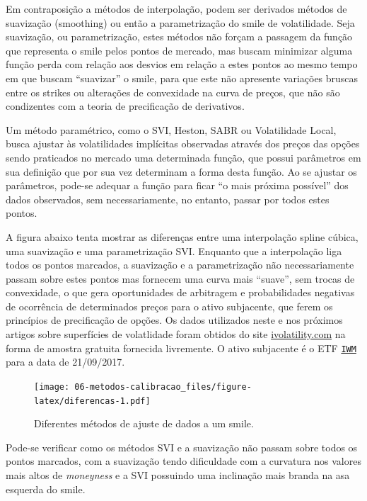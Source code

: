 \documentclass[]{book}
\begin{document}
Em contraposição a métodos de interpolação, podem ser derivados métodos
de suavização (smoothing) ou então a parametrização do smile de
volatilidade. Seja suavização, ou parametrização, estes métodos não
forçam a passagem da função que representa o smile pelos pontos de
mercado, mas buscam minimizar alguma função perda com relação aos
desvios em relação a estes pontos ao mesmo tempo em que buscam
``suavizar'' o smile, para que este não apresente variações bruscas
entre os strikes ou alterações de convexidade na curva de preços, que
não são condizentes com a teoria de precificação de derivativos.

Um método paramétrico, como o SVI, Heston, SABR ou Volatilidade Local,
busca ajustar às volatilidades implícitas observadas através dos preços
das opções sendo praticados no mercado uma determinada função, que
possui parâmetros em sua definição que por sua vez determinam a forma
desta função. Ao se ajustar os parâmetros, pode-se adequar a função para
ficar ``o mais próxima possível'' dos dados observados, sem
necessariamente, no entanto, passar por todos estes pontos.

A figura abaixo tenta mostrar as diferenças entre uma interpolação
spline cúbica, uma suavização e uma parametrização SVI. Enquanto que a
interpolação liga todos os pontos marcados, a suavização e a
parametrização não necessariamente passam sobre estes pontos mas
fornecem uma curva mais ``suave'', sem trocas de convexidade, o que gera
oportunidades de arbitragem e probabilidades negativas de ocorrência de
determinados preços para o ativo subjacente, que ferem os princípios de
precificação de opções. Os dados utilizados neste e nos próximos artigos
sobre superfícies de volatlidade foram obtidos do site
\href{http://www.ivolatility.com/doc/usa/IV_Raw_Delta_surface.csv}{ivolatility.com}
na forma de amostra gratuita fornecida livremente. O ativo subjacente é
o ETF
\href{https://www.ishares.com/us/products/239710/ishares-russell-2000-etf}{\texttt{IWM}}
para a data de 21/09/2017.

\begin{figure}
\centering
\texttt{[image: 06-metodos-calibracao\_files/figure-latex/diferencas-1.pdf]}
\caption{\label{fig:diferencas}Diferentes métodos de ajuste de dados a um
smile.}
\end{figure}

Pode-se verificar como os métodos SVI e a suavização não passam sobre
todos os pontos marcados, com a suavização tendo dificuldade com a
curvatura nos valores mais altos de \emph{moneyness} e a SVI possuindo
uma inclinação mais branda na asa esquerda do smile.
\end{document}
